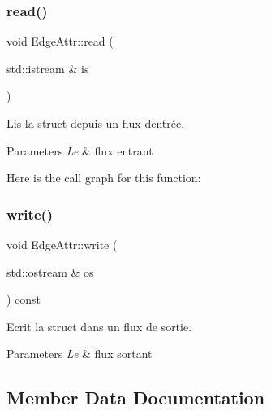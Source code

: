 \subsubsection{\texorpdfstring{read()}{read()}}
{\footnotesize\ttfamily void Edge\+Attr\+::read (\begin{DoxyParamCaption}\item[{std\+::istream \&}]{is }\end{DoxyParamCaption})\hspace{0.3cm}{\ttfamily [inline]}}



Lis la struct depuis un flux d\textquotesingle{}entrée. 


\begin{DoxyParams}{Parameters}
{\em Le} & flux entrant \\
\hline
\end{DoxyParams}
Here is the call graph for this function\+:
\mbox{\label{struct_edge_attr_ae06ea6b6bfd925ea64ce85ca1169411a}} 
\subsubsection{\texorpdfstring{write()}{write()}}
{\footnotesize\ttfamily void Edge\+Attr\+::write (\begin{DoxyParamCaption}\item[{std\+::ostream \&}]{os }\end{DoxyParamCaption}) const\hspace{0.3cm}{\ttfamily [inline]}}



Ecrit la struct dans un flux de sortie. 


\begin{DoxyParams}{Parameters}
{\em Le} & flux sortant \\
\hline
\end{DoxyParams}


\subsection{Member Data Documentation}
\mbox{\label{struct_edge_attr_a56b31d6b4731ac893c4081e0eab931d0}} 
